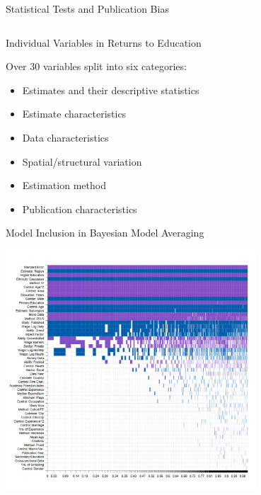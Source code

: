 \documentclass{beamer} %
\begin{document}
\begin{frame}{Statistical Tests and Publication Bias}
\begin{tiny}
\begin{table}[!t]
\begin{tabular}{
                @{}l*{6}{c}
                }
                \bottomrule
            \end{tabular}
        \end{table}

    \end{tiny}
\end{frame}






\begin{frame}{Individual Variables in Returns to Education}

    Over 30 variables split into six categories:
    \vspace{0.3cm}

    \begin{itemize}
        \item<1-> Estimates and their descriptive statistics
        \item<2-> Estimate characteristics
        \item<3-> Data characteristics
        \item<4-> Spatial/structural variation
        \item<5-> Estimation method
        \item<6-> Publication characteristics
    \end{itemize}

\end{frame}


\begin{frame}{Model Inclusion in Bayesian Model Averaging}
    \begin{center}
        \includegraphics[width=0.7\textwidth]{Figures/bma_UIP_dilut_results.png}
    \end{center}
\end{frame}
\end{document}
